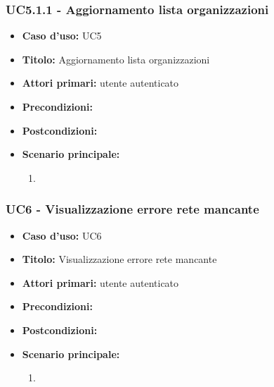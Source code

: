 \documentclass[casi-duso]{subfiles}
\begin{document}
\subsubsection{UC5.1.1 - Aggiornamento lista organizzazioni}
\label{subsub:uc5utente}
\begin{itemize}
  \item \textbf{Caso d’uso:} UC5 
  \item \textbf{Titolo:} Aggiornamento lista organizzazioni
  \item \textbf{Attori primari:} utente autenticato
  \item \textbf{Precondizioni:} 
  \item \textbf{Postcondizioni:}
  \item \textbf{Scenario principale:} 
  \begin{enumerate}
    \item 
  \end{enumerate}  
\end{itemize}

\subsubsection{UC6 - Visualizzazione errore rete mancante}
\label{subsub:uc6utente}
\begin{itemize}
  \item \textbf{Caso d’uso:} UC6
  \item \textbf{Titolo:} Visualizzazione errore rete mancante
  \item \textbf{Attori primari:} utente autenticato
  \item \textbf{Precondizioni:} 
  \item \textbf{Postcondizioni:}
  \item \textbf{Scenario principale:} 
  \begin{enumerate}
    \item 
  \end{enumerate}  
\end{itemize}

\end{document}

